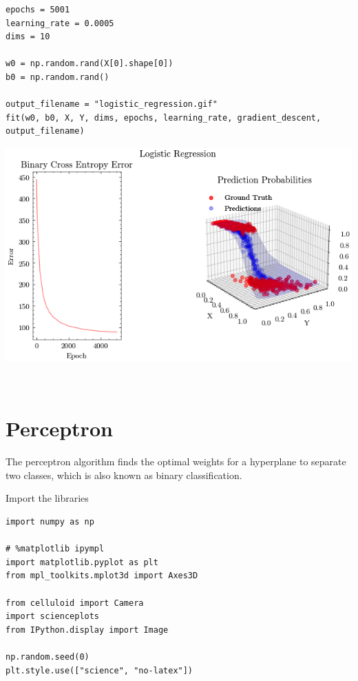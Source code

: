 \documentclass[openany]{book}
\begin{document}
\begin{tcolorbox}
\tiny
\begin{verbatim}
epochs = 5001
learning_rate = 0.0005
dims = 10

w0 = np.random.rand(X[0].shape[0])
b0 = np.random.rand()

output_filename = "logistic_regression.gif"
fit(w0, b0, X, Y, dims, epochs, learning_rate, gradient_descent, output_filename)
\end{verbatim}
\end{tcolorbox}

    \begin{center}
    \includegraphics[width=\textwidth]{combined_files/combined_95_1.png}
    \end{center}
    { \hspace*{\fill} \\}
        
    \section{Perceptron}\label{perceptron}

The perceptron algorithm finds the optimal weights for a hyperplane to
separate two classes, which is also known as binary classification.

    Import the libraries

\begin{tcolorbox}
\tiny
\begin{verbatim}
import numpy as np

# %matplotlib ipympl
import matplotlib.pyplot as plt
from mpl_toolkits.mplot3d import Axes3D

from celluloid import Camera
import scienceplots
from IPython.display import Image

np.random.seed(0)
plt.style.use(["science", "no-latex"])
\end{verbatim}
\end{tcolorbox}
\end{document}
